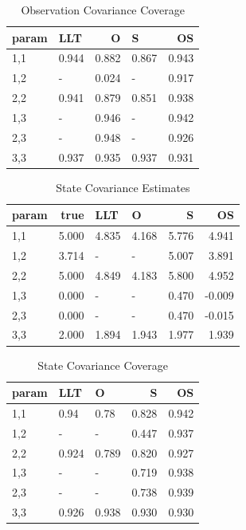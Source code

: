 \documentclass[
]{article}
\begin{document}
\begin{longtable}[t]{l|l|r|l|r}
\caption{\label{tab:unnamed-chunk-23}Observation Covariance Coverage}\\
\hline
param & LLT & O & S & OS\\
\hline
1,1 & 0.944 & 0.882 & 0.867 & 0.943\\
\hline
1,2 & - & 0.024 & - & 0.917\\
\hline
2,2 & 0.941 & 0.879 & 0.851 & 0.938\\
\hline
1,3 & - & 0.946 & - & 0.942\\
\hline
2,3 & - & 0.948 & - & 0.926\\
\hline
3,3 & 0.937 & 0.935 & 0.937 & 0.931\\
\hline
\end{longtable}

\begin{longtable}[t]{l|r|l|l|r|r}
\caption{\label{tab:unnamed-chunk-24}State Covariance Estimates}\\
\hline
param & true & LLT & O & S & OS\\
\hline
1,1 & 5.000 & 4.835 & 4.168 & 5.776 & 4.941\\
\hline
1,2 & 3.714 & - & - & 5.007 & 3.891\\
\hline
2,2 & 5.000 & 4.849 & 4.183 & 5.800 & 4.952\\
\hline
1,3 & 0.000 & - & - & 0.470 & -0.009\\
\hline
2,3 & 0.000 & - & - & 0.470 & -0.015\\
\hline
3,3 & 2.000 & 1.894 & 1.943 & 1.977 & 1.939\\
\hline
\end{longtable}

\begin{longtable}[t]{l|l|l|r|r}
\caption{\label{tab:unnamed-chunk-25}State Covariance Coverage}\\
\hline
param & LLT & O & S & OS\\
\hline
1,1 & 0.94 & 0.78 & 0.828 & 0.942\\
\hline
1,2 & - & - & 0.447 & 0.937\\
\hline
2,2 & 0.924 & 0.789 & 0.820 & 0.927\\
\hline
1,3 & - & - & 0.719 & 0.938\\
\hline
2,3 & - & - & 0.738 & 0.939\\
\hline
3,3 & 0.926 & 0.938 & 0.930 & 0.930\\
\hline
\end{longtable}
\end{document}
